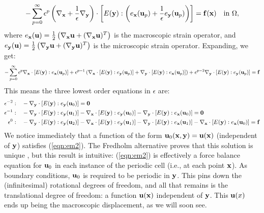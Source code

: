 \documentclass[10pt]{article}
\providecommand{\e}{\epsilon}
\begin{document}
$$
-\sum_{p = 0}^\infty \e^p \left(\nabla_{\bf x} + \frac{1}{\e} \nabla_{\bf y}\right)
    \cdot \left[E({\bf y}) : \left(e_{\bf x}({\bf u}_p) + \frac{1}{\e} e_{\bf y}({\bf u}_p) \right) \right]
    = {\bf f}({\bf x}) \quad \text{in } \Omega,
$$
where $e_{\bf x}({\bf u}) = \frac{1}{2} \left( \nabla_{\bf x} {\bf u} + (\nabla_{\bf x}
{\bf u})^T \right)$ is the macroscopic strain operator, and $e_{\bf y}({\bf u}) =
\frac{1}{2} \left( \nabla_{\bf y} {\bf u} + (\nabla_{\bf y} {\bf u})^T \right)$
is the microscopic strain operator. Expanding, we get:
$$
-\sum_{p = 0}^\infty \e^p \nabla_{\bf x} \cdot [E({\bf y}) : e_{\bf x}({\bf u}_p)] +
\e^{p - 1} \left(\nabla_{\bf x} \cdot [E({\bf y}) : e_{\bf y}({\bf u}_p)] +
                 \nabla_{\bf y} \cdot [E({\bf y}) : e_{\bf x}({\bf u}_p)] \right) +
                 \e^{p - 2} \nabla_{\bf y} \cdot [E({\bf y}) : e_{\bf y}({\bf u}_p)] = {\bf f}
$$
This means the three lowest order equations in $\e$ are:
\begin{align}
    \e^{-2}:\quad  &-\nabla_{\bf y} \cdot [E({\bf y}) : e_{\bf y}({\bf u}_0)] = {\bf 0} \label{eqn:em2} \\
    \e^{-1}:\quad  &-\nabla_{\bf y} \cdot [E({\bf y}) : e_{\bf y}({\bf u}_1)] - 
                     \nabla_{\bf x} \cdot [E({\bf y}) : e_{\bf y}({\bf u}_0)] -
                     \nabla_{\bf y} \cdot [E({\bf y}) : e_{\bf x}({\bf u}_0)] = {\bf 0} \label{eqn:em1} \\
    \e^{ 0}:\quad  &-\nabla_{\bf y} \cdot [E({\bf y}) : e_{\bf y}({\bf u}_2)] - 
                     \nabla_{\bf x} \cdot [E({\bf y}) : e_{\bf y}({\bf u}_1)] -
                     \nabla_{\bf y} \cdot [E({\bf y}) : e_{\bf x}({\bf u}_1)] -
                     \nabla_{\bf x} \cdot [E({\bf y}) : e_{\bf x}({\bf u}_0)] = {\bf f} \label{eqn:e0}
\end{align}
We notice immediately that a function of the form ${\bf u}_0({\bf x}, {\bf y}) = {\bf u}({\bf x})$
(independent of ${\bf y}$) satisfies (\ref{eqn:em2}). The Fredholm alternative
proves that this solution is unique \cite[Lemma 2.3.21]{allaire2002shape}, but
this result is intuitive: (\ref{eqn:em2}) is effectively a force balance
equation for ${\bf u}_0$ in each instance of the periodic cell (i.e., at each
point ${\bf x}$). As boundary conditions, ${\bf u}_0$ is required to be
periodic in ${\bf y}$. This pins down the (infinitesimal) rotational degrees of
freedom, and all that remains is the translational degree of freedom: a
function ${\bf u}({\bf x})$ independent of ${\bf y}$. This ${\bf u}(x)$ ends up
being the macroscopic displacement, as we will soon see.
\end{document}
